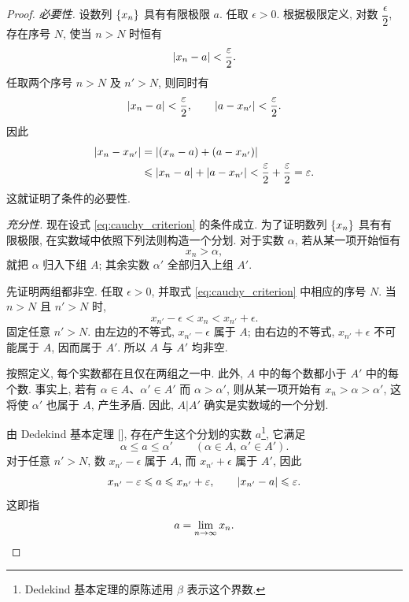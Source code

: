 \begin{proof}
\emph{必要性.}
设数列 $\{x_{n}\}$ 具有有限极限 $a$.
任取 $\epsilon>0$. 根据极限定义, 对数 $\dfrac{\epsilon}{2}$,
存在序号 $N$, 使当 $n>N$ 时恒有
$$
\left| x_n-a \right|<\frac{\varepsilon}{2}.
$$
任取两个序号 $n>N$ 及 $n'>N$, 则同时有
$$
\left| x_n-a \right|<\frac{\varepsilon}{2},\qquad
\left| a-x_{n'} \right|<\frac{\varepsilon}{2}.
$$
因此
$$
\begin{aligned}
\left| x_n-x_{n'} \right|
&=\left| (x_n-a)+(a-x_{n'}) \right|\\
&\leqslant\left| x_n-a \right|+\left| a-x_{n'} \right|
<\frac{\varepsilon}{2}+\frac{\varepsilon}{2}
=\varepsilon.
\end{aligned}
$$
这就证明了条件的必要性.

\emph{充分性.}
现在设式 \eqref{eq:cauchy_criterion} 的条件成立.
为了证明数列 $\{x_{n}\}$ 具有有限极限, 在实数域中依照下列法则构造一个分划.
对于实数 $\alpha$, 若从某一项开始恒有
$$
x_n>\alpha,
$$
就把 $\alpha$ 归入下组 $A$;
其余实数 $\alpha'$ 全部归入上组 $A'$.

先证明两组都非空.
任取 $\epsilon>0$, 并取式 \eqref{eq:cauchy_criterion} 中相应的序号 $N$.
当 $n>N$ 且 $n'>N$ 时,
\begin{equation}\label{eq:cauchy_tail_bounds}
x_{n'}-\epsilon<x_n<x_{n'}+\epsilon.
\end{equation}
固定任意 $n'>N$.
由左边的不等式, $x_{n'}-\epsilon$ 属于 $A$;
由右边的不等式, $x_{n'}+\epsilon$ 不可能属于 $A$, 因而属于 $A'$.
所以 $A$ 与 $A'$ 均非空.

按照定义, 每个实数都在且仅在两组之一中.
此外, $A$ 中的每个数都小于 $A'$ 中的每个数.
事实上, 若有 $\alpha\in A$、$\alpha'\in A'$ 而 $\alpha>\alpha'$,
则从某一项开始有 $x_n>\alpha>\alpha'$, 这将使 $\alpha'$ 也属于 $A$, 产生矛盾.
因此, $A|A'$ 确实是实数域的一个分划.

由 Dedekind 基本定理 [],
存在产生这个分划的实数
$a$\footnote{Dedekind 基本定理的原陈述用 $\beta$ 表示这个界数.},
它满足
$$
\alpha\leqslant a\leqslant\alpha'
\qquad(\alpha\in A,\ \alpha'\in A').
$$
对于任意 $n'>N$, 数 $x_{n'}-\epsilon$ 属于 $A$,
而 $x_{n'}+\epsilon$ 属于 $A'$, 因此
$$
x_{n'}-\varepsilon\leqslant a\leqslant x_{n'}+\varepsilon,
\qquad
\left| x_{n'}-a \right|\leqslant\varepsilon.
$$
这即指
$$
a=\lim\limits_{n \to \infty}x_n.
$$
\end{proof}

